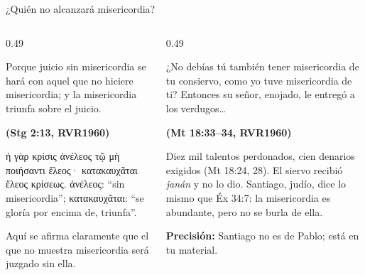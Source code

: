 \documentclass[hyperref={bookmarks=false},aspectratio=169]{beamer}
\newcommand{\grc}[1]{\foreignlanguage{ancientgreek}{#1}}
\newcommand{\fuente}[1]{\par\hfill{\upshape\bfseries\footnotesize\textcolor{azul}{#1}}}
\newcommand{\precision}[1]{{\footnotesize\color{gris}\textbf{Precisión:} #1}}
\begin{document}
\begin{frame}{¿Quién no alcanzará misericordia?}
\begin{columns}[t,onlytextwidth]
\begin{column}{0.49\textwidth}
\begin{cita}Porque juicio sin misericordia se hará con aquel que no hiciere misericordia; y la misericordia triunfa sobre el juicio.\fuente{(Stg 2:13, RVR1960)}\end{cita}
\scriptsize\grc{ἡ γὰρ κρίσις ἀνέλεος τῷ μὴ ποιήσαντι ἔλεος· κατακαυχᾶται ἔλεος κρίσεως}. \grc{ἀνέλεος}: ``sin misericordia''; \grc{κατακαυχᾶται}: ``se gloría por encima de, triunfa''.\par\medskip
\small Aquí se afirma claramente que el que no muestra misericordia será juzgado sin ella.
\end{column}
\begin{column}{0.49\textwidth}
\begin{cita}¿No debías tú también tener misericordia de tu consiervo, como yo tuve misericordia de ti? Entonces su señor, enojado, le entregó a los verdugos\ldots{}\fuente{(Mt 18:33--34, RVR1960)}\end{cita}
\scriptsize Diez mil talentos perdonados, cien denarios exigidos (Mt 18:24, 28). El siervo recibió \emph{janán} y no lo dio. Santiago, judío, dice lo mismo que Éx 34:7: la misericordia es abundante, pero no se burla de ella.\par\smallskip
\precision{Santiago no es de Pablo; está en tu material.}
\end{column}
\end{columns}
\end{frame}
\end{document}

